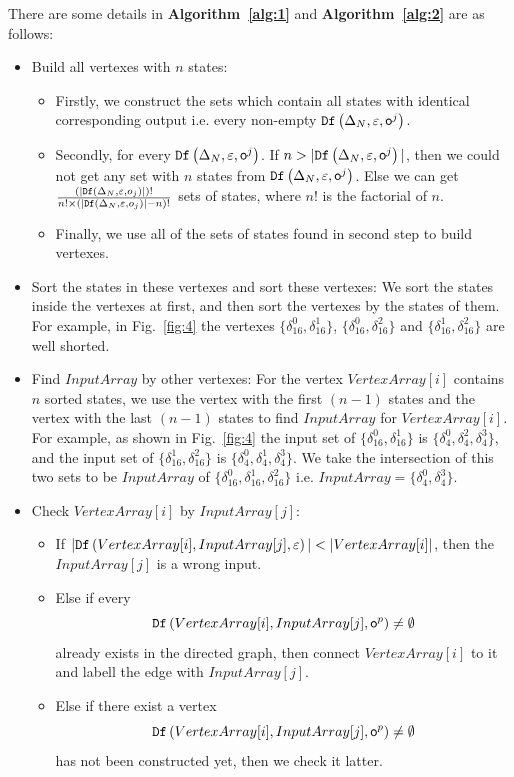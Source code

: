 There are some details in {\bf Algorithm~\ref{alg:1}} and {\bf Algorithm~\ref{alg:2}} are as follows:
\begin{itemize}
\item Build all vertexes with $n$ states:
\begin{itemize}
\item Firstly, we construct the sets which contain all states with identical corresponding output i.e. every non-empty ${\tt Df}\left(\Delta_N,\varepsilon,\mathsf{o}^{j}\right)$.
\item Secondly, for every ${\tt Df}\left(\Delta_N,\varepsilon,\mathsf{o}^{j}\right)$. If $n>|{\tt Df}\left(\Delta_N,\varepsilon,\mathsf{o}^{j}\right)|$, then we could not get any set with $n$ states from ${\tt Df}\left(\Delta_N,\varepsilon,\mathsf{o}^{j}\right)$. Else we can get $\frac{(|{\tt Df}\left(\Delta_N,\varepsilon,o_j\right)|)!}{n!\times (|{\tt Df}\left(\Delta_N,\varepsilon,o_j\right)|-n)!}$ sets of states, where $n!$ is the factorial of $n$.
\item Finally, we use all of the sets of states found in second step to build vertexes. 
\end{itemize} 
 \item Sort the states in these vertexes and sort these vertexes: We sort the states inside the vertexes at first, and then sort the vertexes by the states of them. For example, in Fig.~\ref{fig:4} the vertexes $\{\delta_{16}^0,\delta_{16}^1\}$, $\{\delta_{16}^0,\delta_{16}^2\}$ and $\{\delta_{16}^1,\delta_{16}^2\}$ are well shorted. 
  \item Find $InputArray$ by other vertexes:
   For the vertex $VertexArray[i]$ contains $n$ sorted states, we use the vertex with the first $(n-1)$ states and the vertex with the last $(n-1)$ states to find $InputArray$ for $VertexArray[i]$. For example, as shown in Fig.~\ref{fig:4} the input set of $\{\delta_{16}^0,\delta_{16}^1\}$ is $\{\delta_{4}^0,\delta_{4}^2,\delta_{4}^3\}$, and the input set of $\{\delta_{16}^1,\delta_{16}^2\}$ is $\{\delta_{4}^0,\delta_{4}^1,\delta_{4}^3\}$. We take the intersection of this two sets to be $InputArray$ of $\{\delta_{16}^0,\delta_{16}^1,\delta_{16}^2\}$ i.e. $InputArray=\{\delta_{4}^0,\delta_{4}^3\}$. 
  \item Check $VertexArray[i]$ by $InputArray[j]$:
     
\begin{itemize}
\item If $|\Ded\left(VertexArray[i],InputArray[j],\varepsilon\right)|<|VertexArray[i]|$, then the $InputArray[j]$ is a wrong input.
\item Else if every \[{\tt Df}\left(VertexArray[i],InputArray[j],\mathsf{o}^{p}\right)\ne\emptyset\] already exists in the directed graph, then connect $VertexArray[i]$ to it and labell the edge with $InputArray[j]$.
\item Else if there exist a vertex \[{\tt Df}\left(VertexArray[i],InputArray[j],\mathsf{o}^{p}\right)\ne\emptyset\] has not been constructed yet, then we check it latter. 
\end{itemize} 
\end{itemize} 


